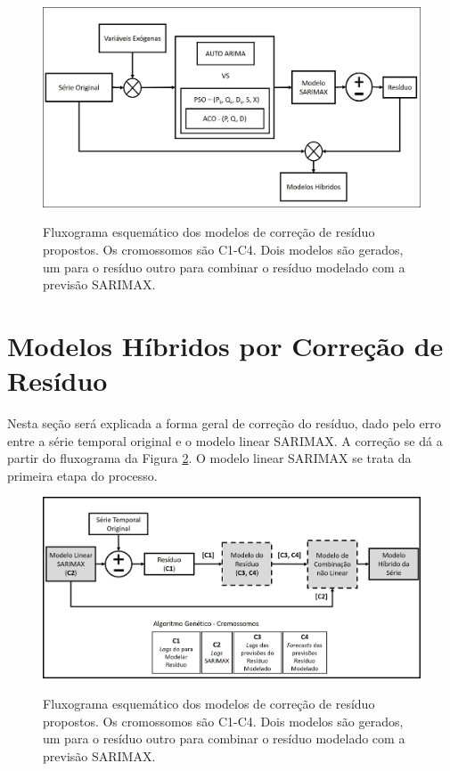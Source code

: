 \begin{figure}[!htbp]
    \centering
    \caption{Fluxograma esquemático dos modelos de correção de resíduo propostos. Os cromossomos são C1-C4. Dois modelos são gerados, um para o resíduo outro para combinar o resíduo modelado com a previsão SARIMAX.}
    \includegraphics[width=\textwidth]{Figuras/cap3/fluxograma_sarimax.jpg}
    \label{fig:cap3_fluxograma_sarimax}
\end{figure}

\section{Modelos Híbridos por Correção de Resíduo}
\label{subsec:modelos_hibridos}

Nesta seção será explicada a forma geral de correção do resíduo, dado pelo erro entre a série temporal original e o modelo linear SARIMAX. A correção se dá a partir do fluxograma da Figura \ref{fig:cap3_fluxograma_cromossomo}. O modelo linear SARIMAX se trata da primeira etapa do processo.

\begin{figure}[htbp]
    \centering
    \caption{Fluxograma esquemático dos modelos de correção de resíduo propostos. Os cromossomos são C1-C4. Dois modelos são gerados, um para o resíduo outro para combinar o resíduo modelado com a previsão SARIMAX.}
    \includegraphics[width=\textwidth]{Figuras/cap3/fluxograma_cromossomos.jpg}
    \label{fig:cap3_fluxograma_cromossomo}
\end{figure}

